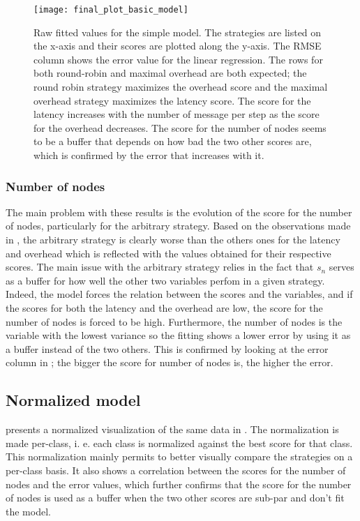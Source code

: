 \begin{figure}[h]
    \centering
    \texttt{[image: final\_plot\_basic\_model]}
    \caption{Raw fitted values for the simple model. The strategies are listed
    on the x-axis and their scores are plotted along the y-axis. The RMSE column shows the error value for the linear
        regression. The rows for both round-robin and maximal overhead are both
        expected; the round robin strategy maximizes the overhead score and the
        maximal overhead strategy maximizes the latency score. The score for the
        latency increases with the number of message per step as the score for
        the overhead decreases. The score for the number of nodes seems to be a
        buffer that depends on how bad the two other scores are, which is
        confirmed by the error that increases with it.
    }
    \label{fig:recapTestsPlot}
\end{figure}

\subsubsection{Number of nodes}
\label{ssec:nbNodes}
The main problem with these results is the evolution of the score for the number
of nodes, particularly for the arbitrary strategy. Based on the observations
made in , the arbitrary strategy is clearly worse than the
others ones for the latency and overhead which is reflected with the values
obtained for their respective scores. The main issue with the arbitrary strategy
relies in the fact that \(s_n\) serves as a buffer for how well the other two
variables perfom in a given strategy.  Indeed, the model forces the relation
between the scores and the variables, and if the scores for both the latency and
the overhead are low, the score for the number of nodes is forced to be high.
Furthermore, the number of nodes is the variable with the lowest variance so the
fitting shows a lower error by using it as a buffer instead of the two others.
This is confirmed by looking at the error column in ; the
bigger the score for number of nodes is, the higher the error. 

\FloatBarrier
\subsection{Normalized model}
 presents a normalized visualization of the same
data in . The normalization is made per-class, i. e.
each class is normalized against the best score for that class. This
normalization mainly permits to better visually compare the strategies on a
per-class basis. It also shows a correlation between the scores for the number
of nodes and the error values, which further confirms that the score for the
number of nodes is used as a buffer when the two other scores are sub-par and
don't fit the model.


